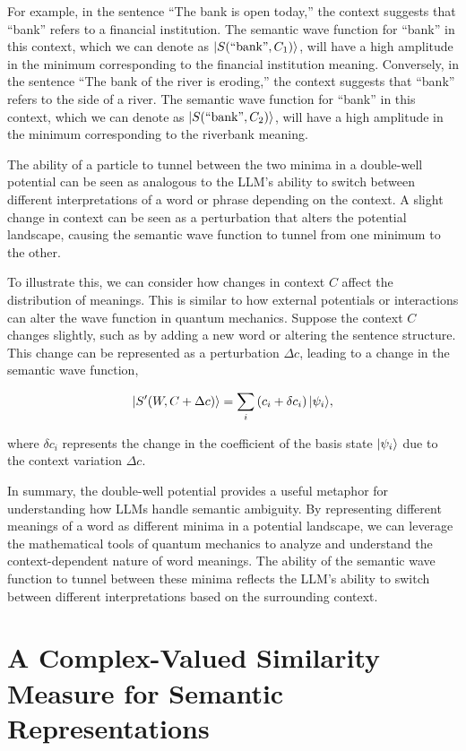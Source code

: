 \documentclass[prd,amsmath,amssymb,12pt]{revtex4}
\DeclarePairedDelimiter\ket{\lvert}{\rangle}
\begin{document}
For example, in the sentence ``The bank is open today,'' the context suggests that ``bank'' refers to a financial institution.
The semantic wave function for ``bank'' in this context, which we can denote as $\ket{S(\text{``bank''}, C_1)}$,
will have a high amplitude in the minimum corresponding to the financial institution meaning.
Conversely, in the sentence ``The bank of the river is eroding,'' the context suggests that ``bank''
refers to the side of a river. The semantic wave function for ``bank'' in this context, which we can denote
as $\ket{S(\text{``bank''}, C_2)}$, will have a high amplitude in the minimum corresponding to the riverbank meaning.

The ability of a particle to tunnel between the two minima in a double-well potential can be seen as analogous to the
LLM's ability to switch between different interpretations of a word or phrase depending on the context. A slight change
in context can be seen as a perturbation that alters the potential landscape, causing the semantic wave function to tunnel
from one minimum to the other.

To illustrate this, we can consider how changes in context $C$ affect the distribution of meanings.
This is similar to how external potentials or interactions can alter the wave function in quantum mechanics.
Suppose the context $C$ changes slightly, such as by adding a new word or altering the sentence structure. This change
can be represented as a perturbation $\Delta c$, leading to a change in the semantic wave function,

\begin{equation}
\ket{S'(W, C + \Delta c)} = \sum_{i} \left(c_i + \delta c_i\right)\ket{\psi_i},
\end{equation}

\noindent
where $\delta c_i$ represents the change in the coefficient of the basis state $\ket{\psi_i}$ due to the context
variation $\Delta c$.

In summary, the double-well potential provides a useful metaphor for understanding how LLMs handle semantic ambiguity.
By representing different meanings of a word as different minima in a potential landscape, we can leverage the mathematical
tools of quantum mechanics to analyze and understand the context-dependent nature of word meanings. The ability of the
semantic wave function to tunnel between these minima reflects the LLM's ability to switch between different interpretations
based on the surrounding context.

\section{A Complex-Valued Similarity Measure for Semantic Representations}
\end{document}
